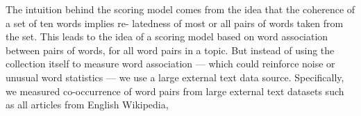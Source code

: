 \begin{enumerate}
 
 The intuition behind the scoring model comes from the
 idea that the coherence of a set of ten words implies re-
 latedness of most or all pairs of words taken from the set.
 This leads to the idea of a scoring model based on word
 association between pairs of words, for all word pairs in a
 topic. But instead of using the collection itself to measure
 word association — which could reinforce noise or unusual
 word statistics — we use a large external text data source.
 Specifically, we measured co-occurrence of word pairs from
 large external text datasets such as all articles from English
 Wikipedia,

\end{enumerate}
